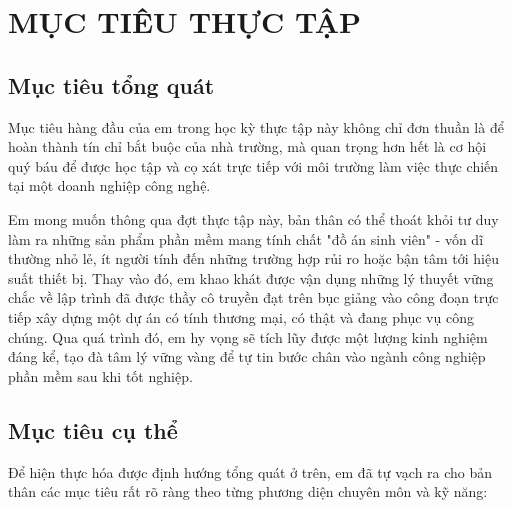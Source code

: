 \documentclass[12pt, a4paper]{article}
\begin{document}
\section{MỤC TIÊU THỰC TẬP}
\subsection{Mục tiêu tổng quát}
Mục tiêu hàng đầu của em trong học kỳ thực tập này không chỉ đơn thuần là để hoàn thành tín chỉ bắt buộc của nhà trường, mà quan trọng hơn hết là cơ hội quý báu để được học tập và cọ xát trực tiếp với môi trường làm việc thực chiến tại một doanh nghiệp công nghệ. 

Em mong muốn thông qua đợt thực tập này, bản thân có thể thoát khỏi tư duy làm ra những sản phẩm phần mềm mang tính chất "đồ án sinh viên" - vốn dĩ thường nhỏ lẻ, ít người tính đến những trường hợp rủi ro hoặc bận tâm tới hiệu suất thiết bị. Thay vào đó, em khao khát được vận dụng những lý thuyết vững chắc về lập trình đã được thầy cô truyền đạt trên bục giảng vào công đoạn trực tiếp xây dựng một dự án có tính thương mại, có thật và đang phục vụ công chúng. Qua quá trình đó, em hy vọng sẽ tích lũy được một lượng kinh nghiệm đáng kể, tạo đà tâm lý vững vàng để tự tin bước chân vào ngành công nghiệp phần mềm sau khi tốt nghiệp.

\subsection{Mục tiêu cụ thể}
Để hiện thực hóa được định hướng tổng quát ở trên, em đã tự vạch ra cho bản thân các mục tiêu rất rõ ràng theo từng phương diện chuyên môn và kỹ năng:
\end{document}
